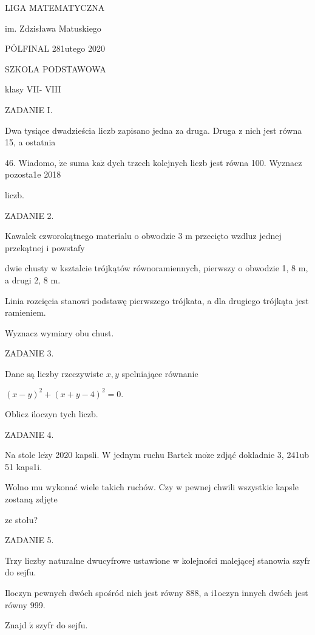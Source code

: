 \documentclass[a4paper,12pt]{article}
\begin{document}
LIGA MATEMATYCZNA

im. Zdzisława Matuskiego

PÓLFINAL 281utego 2020

SZKOLA PODSTAWOWA

klasy VII- VIII

ZADANIE I.

Dwa tysiące dwadzieścia liczb zapisano jedna za druga. Druga z nich jest równa 15, a ostatnia

46. Wiadomo, $\dot{\mathrm{z}}\mathrm{e}$ suma $\mathrm{k}\mathrm{a}\dot{\mathrm{z}}$ dych trzech kolejnych liczb jest równa 100. Wyznacz pozosta1e 2018

liczb.

ZADANIE 2.

Kawalek czworokątnego materialu o obwodzie 3 $\mathrm{m}$ przecięto wzdluz jednej przekątnej i powstafy

dwie chusty w ksztalcie trójkątów równoramiennych, pierwszy o obwodzie 1, 8 $\mathrm{m}$, a drugi 2, 8 $\mathrm{m}.$

Linia rozcięcia stanowi podstawę pierwszego trójkata, a dla drugiego trójkąta jest ramieniem.

Wyznacz wymiary obu chust.

ZADANIE 3.

Dane są liczby rzeczywiste $x, y$ spelniające równanie

$(x-y)^{2}+(x+y-4)^{2}=0.$

Oblicz iloczyn tych liczb.

ZADANIE 4.

Na stole $\mathrm{l}\mathrm{e}\dot{\mathrm{z}}\mathrm{y}$ 2020 kapsli. $\mathrm{W}$ jednym ruchu Bartek $\mathrm{m}\mathrm{o}\dot{\mathrm{z}}\mathrm{e}$ zdjąć dokladnie 3, 241ub 51 kaps1i.

Wolno mu wykonać wiele takich ruchów. Czy w pewnej chwili wszystkie kapsle zostaną zdjęte

ze stołu?

ZADANIE 5.

Trzy liczby naturalne dwucyfrowe ustawione w kolejności malejącej stanowia szyfr do sejfu.

Iloczyn pewnych dwóch spośród nich jest równy 888, a i1oczyn innych dwóch jest równy 999.

Znajd $\acute{\mathrm{z}}$ szyfr do sejfu.
\end{document}
